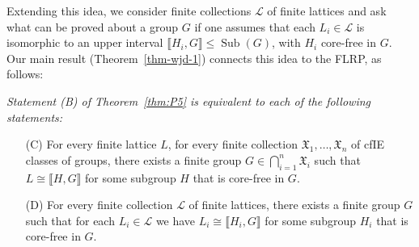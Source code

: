\documentclass{gen-j-l}
\newcommand{\lb}{\ensuremath{\llbracket}}
\newcommand{\rb}{\ensuremath{\rrbracket}}
\newcommand{\<}{\ensuremath{\langle}}
\renewcommand{\>}{\ensuremath{\rangle}}
\theoremstyle{plain}
\newtheorem{lemma}[theorem]{Lemma}
\theoremstyle{definition}
\theoremstyle{remark}
\numberwithin{theorem}{section}
\numberwithin{claim}{section}
\numberwithin{equation}{section}
\numberwithin{conjecture}{section}
\renewcommand{\leq}{\ensuremath{\leqslant}}
\newcommand{\Sub}{\ensuremath{\operatorname{Sub}}}
\newcommand{\2}{\ensuremath{\mathbf{2}}}
\newcommand{\3}{\ensuremath{\mathbf{3}}}
\newcommand{\sG}{\ensuremath{\mathfrak{X}}}
\newcommand{\sL}{\ensuremath{\mathscr{L}}}
\begin{document}
Extending this idea, we consider finite collections $\sL$ of finite lattices
and ask what can be proved about a group $G$ if one assumes that each 
$L_i\in \sL$ is isomorphic to an upper interval $\lb H_i, G \rb\leq \Sub(G)$, with
$H_i$ core-free in $G$.  Our main result (Theorem~\ref{thm-wjd-1}) connects this idea to
the \acs{FLRP}, as follows:\\[6pt]
{\it 
Statement (B) of Theorem~\ref{thm:P5} is equivalent to each of the following statements:
\begin{enumerate}
\item[(C)]
For every finite lattice $L$, for every finite collection $\sG_1, \dots, \sG_n$
of \acs{cfIE} classes of groups,
there exists a finite group $G \in \bigcap\limits_{i=1}^n \sG_i$ such that $L \cong
\lb H,G \rb$ for some subgroup $H$ that is core-free in $G$. %



\item[(D)]
For every finite collection $\sL$ of finite lattices, there exists a finite
group $G$ such that for each $L_i \in \sL$ we have 
$L_i\cong \lb H_i, G \rb$ for some subgroup $H_i$ that is core-free in $G$. %
\end{enumerate}}
\end{document}
